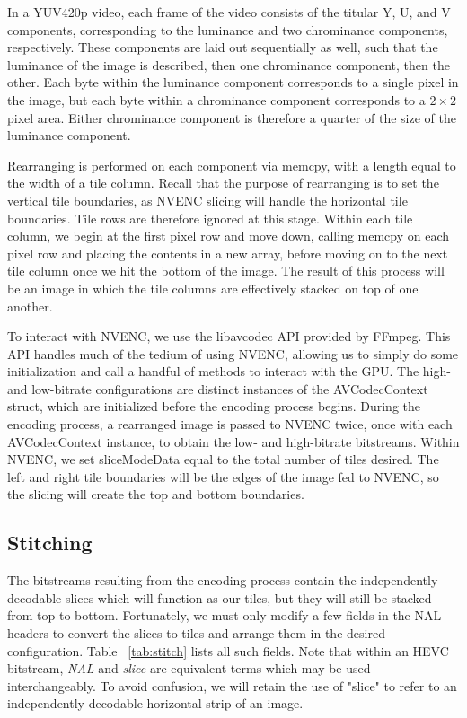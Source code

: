 In a YUV420p video, each frame of the video consists of the titular Y, U, and V components, corresponding to the luminance and two chrominance components, respectively. These components are laid out sequentially as well, such that the luminance of the image is described, then one chrominance component, then the other. Each byte within the luminance component corresponds to a single pixel in the image, but each byte within a chrominance component corresponds to a $2\times2$ pixel area. Either chrominance component is therefore a quarter of the size of the luminance component. 

Rearranging is performed on each component via memcpy, with a length equal to the width of a tile column. Recall that the purpose of rearranging is to set the vertical tile boundaries, as NVENC slicing will handle the horizontal tile boundaries. Tile rows are therefore ignored at this stage. Within each tile column, we begin at the first pixel row and move down, calling memcpy on each pixel row and placing the contents in a new array, before moving on to the next tile column once we hit the bottom of the image. The result of this process will be an image in which the tile columns are effectively stacked on top of one another.

To interact with NVENC, we use the libavcodec API provided by FFmpeg. This API handles much of the tedium of using NVENC, allowing us to simply do some initialization and call a handful of methods to interact with the GPU. The high- and low-bitrate configurations are distinct instances of the AVCodecContext struct, which are initialized before the encoding process begins. During the encoding process, a rearranged image is passed to NVENC twice, once with each AVCodecContext instance, to obtain the low- and high-bitrate bitstreams. Within NVENC, we set sliceModeData equal to the total number of tiles desired. The left and right tile boundaries will be the edges of the image fed to NVENC, so the slicing will create the top and bottom boundaries.

\subsection{Stitching}
The bitstreams resulting from the encoding process contain the independently-decodable slices which will function as our tiles, but they will still be stacked from top-to-bottom. Fortunately, we must only modify a few fields in the NAL headers to convert the slices to tiles and arrange them in the desired configuration. Table ~\ref{tab:stitch} lists all such fields. Note that within an HEVC bitstream, \textit{NAL} and \textit{slice} are equivalent terms which may be used interchangeably. To avoid confusion, we will retain the use of "slice" to refer to an independently-decodable horizontal strip of an image.

